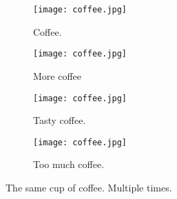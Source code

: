 \documentclass{article}
\begin{document}
	\begin{figure}[h!]
		\centering
		\begin{subfigure}[b]{0.2\linewidth}
			
		\texttt{[image: coffee.jpg]}
		\caption{Coffee.} \end{subfigure}
	    \begin{subfigure}[b]{0.2\linewidth}
	    	\texttt{[image: coffee.jpg]}
	    	\caption{More coffee}
	    \end{subfigure}
        \begin{subfigure}[b]{0.2\linewidth}
        	\texttt{[image: coffee.jpg]}
        	\caption{Tasty coffee.}
        \end{subfigure}
        \begin{subfigure}[b]{0.5\linewidth}
        	\texttt{[image: coffee.jpg]}
        	\caption{Too much coffee.}
        \end{subfigure}
        \caption{The same cup of coffee. Multiple times.}
        \label{fig:coffee3}
     \end{figure}
 
\end{document}
